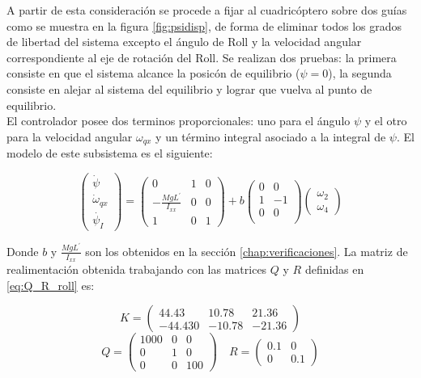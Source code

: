 \documentclass[main]{subfiles}
\begin{document}
A partir de esta consideraci\'on se procede a fijar al cuadric\'optero sobre dos gu\'ias como se muestra en la figura \ref{fig:psidisp}, de forma de eliminar todos los grados de libertad del sistema excepto el \'angulo de Roll y la velocidad angular correspondiente al eje de rotaci\'on del Roll. Se realizan dos pruebas: la primera consiste en que el sistema alcance la posic\'on de equilibrio ($\psi = 0$), la segunda consiste en alejar al sistema del equilibrio y lograr que vuelva al punto de equilibrio.\\

El controlador posee dos terminos proporcionales: uno para el \'angulo $\psi$ y el otro para la velocidad angular $\omega_{qx}$ y un t\'ermino integral asociado a la integral de $\psi$. El modelo de este subsistema es el siguiente: 

\begin{equation}
\left(\begin{array}{c}
\dot{\psi}\\
\dot{\omega}_{qx}\\
\dot{\psi_I}
\end{array}\right) = \left(\begin{array}{ccc}
0 & 1 & 0\\
-\frac{MgL^\prime}{I_{xx}} & 0 & 0\\
1 & 0 &1
\end{array}\right) + b\left(\begin{array}{cc}
0 & 0\\
1 & -1\\
0 & 0\\
\end{array}\right) \left(\begin{array}{c}
\omega_2 \\
\omega_4
\end{array}\right)
\end{equation}

Donde $b$ y $\frac{MgL^\prime}{I_{xx}}$ son los obtenidos en la secci\'on \ref{chap:verificaciones}. La matriz de realimentaci\'on obtenida trabajando con las matrices $Q$ y $R$ definidas en \ref{eq:Q_R_roll} es:

\begin{equation}
\label{K_roll}
K = \left( \begin{array}{ccc}
44.43 & 10.78 &21.36\\
-44.430 & -10.78 &-21.36
\end{array}\right)
\end{equation}
\begin{equation}
\label{eq:Q_R_roll}
Q = \left(\begin{array}{ccc}
1000 & 0 & 0\\
0 & 1 & 0\\
0 & 0 & 100 
\end{array} \right) \quad R =\left(\begin{array}{cc}
0.1 & 0 \\
0 & 0.1
\end{array}\right)
\end{equation}\\	
\end{document}
